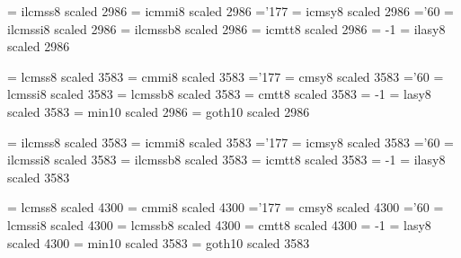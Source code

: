 \font\itwentyfourrm   = ilcmss8  scaled 2986 %
\font\itwentyfouri    = icmmi8   scaled 2986 %
    \skewchar\itwentyfouri ='177                  %
\font\itwentyfoursy   = icmsy8   scaled 2986 %
    \skewchar\itwentyfoursy ='60           %
\font\itwentyfourit   = ilcmssi8 scaled 2986 %
\font\itwentyfourbf   = ilcmssb8 scaled 2986 %
\font\itwentyfourtt   = icmtt8   scaled 2986 %
    \hyphenchar\itwentyfourtt = -1         %
\font\itwentyfourlasy = ilasy8  scaled 2986 %

\font\twentyninerm   = lcmss8  scaled 3583 %
\font\twentyninei    = cmmi8   scaled 3583 %
    \skewchar\twentyninei ='177                  %
\font\twentyninesy   = cmsy8   scaled 3583 %
    \skewchar\twentyninesy ='60           %
\font\twentynineit   = lcmssi8 scaled 3583 %
\font\twentyninebf   = lcmssb8 scaled 3583 %
\font\twentyninett   = cmtt8   scaled 3583 %
    \hyphenchar\twentyninett = -1         %
\font\twentyninelasy = lasy8  scaled 3583 %
\font\twentyninemin  = min10 scaled  2986
\font\twentyninegt   = goth10 scaled 2986

\font\itwentyninerm   = ilcmss8  scaled 3583 %
\font\itwentyninei    = icmmi8   scaled 3583 %
    \skewchar\itwentyninei ='177                  %
\font\itwentyninesy   = icmsy8   scaled 3583 %
    \skewchar\itwentyninesy ='60           %
\font\itwentynineit   = ilcmssi8 scaled 3583 %
\font\itwentyninebf   = ilcmssb8 scaled 3583 %
\font\itwentyninett   = icmtt8   scaled 3583 %
    \hyphenchar\itwentyninett = -1         %
\font\itwentyninelasy = ilasy8  scaled 3583 %

\font\thirtyfourrm   = lcmss8  scaled 4300 %
\font\thirtyfouri    = cmmi8   scaled 4300 %
    \skewchar\thirtyfouri ='177                  %
\font\thirtyfoursy   = cmsy8   scaled 4300 %
    \skewchar\thirtyfoursy ='60           %
\font\thirtyfourit   = lcmssi8 scaled 4300 %
\font\thirtyfourbf   = lcmssb8 scaled 4300 %
\font\thirtyfourtt   = cmtt8   scaled 4300 %
    \hyphenchar\thirtyfourtt = -1         %
\font\thirtyfourlasy = lasy8  scaled 4300 %
\font\thirtyfourmin  = min10 scaled 3583
\font\thirtyfourgt  = goth10 scaled 3583

